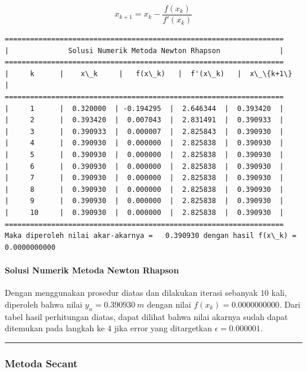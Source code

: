\documentclass[10pt, a4paper]{article}
\begin{document}
\[x_{k+1} = x_k - \frac{f(x_k)}{f'(x_k)}\]

    \begin{Verbatim}[commandchars=\\\{\}]
==================================================================
|              Solusi Numerik Metoda Newton Rhapson              |
==================================================================
|     k      |    x\_k     |   f(x\_k)   |  f'(x\_k)   |  x\_\{k+1\}   |
==================================================================
|     1      |  0.320000  | -0.194295  |  2.646344  |  0.393420  | 
|     2      |  0.393420  |  0.007043  |  2.831491  |  0.390933  | 
|     3      |  0.390933  |  0.000007  |  2.825843  |  0.390930  | 
|     4      |  0.390930  |  0.000000  |  2.825838  |  0.390930  | 
|     5      |  0.390930  |  0.000000  |  2.825838  |  0.390930  | 
|     6      |  0.390930  |  0.000000  |  2.825838  |  0.390930  | 
|     7      |  0.390930  |  0.000000  |  2.825838  |  0.390930  | 
|     8      |  0.390930  |  0.000000  |  2.825838  |  0.390930  | 
|     9      |  0.390930  |  0.000000  |  2.825838  |  0.390930  | 
|     10     |  0.390930  |  0.000000  |  2.825838  |  0.390930  | 
==================================================================
Maka diperoleh nilai akar-akarnya =   0.390930 dengan hasil f(x\_k) =    0.0000000000

    \end{Verbatim}

    \paragraph{Solusi Numerik Metoda Newton
Rhapson}\label{solusi-numerik-metoda-newton-rhapson}

Dengan menggunakan prosedur diatas dan dilakukan iterasi sebanyak \(10\)
kali, diperoleh bahwa nilai \(y_n = 0.390930\ m\) dengan nilai
\(f(x_k) = 0.0000000000\). Dari tabel hasil perhitungan diatas, dapat
dilihat bahwa nilai akarnya sudah dapat ditemukan pada langkah ke \(4\)
jika error yang ditargetkan \(\epsilon = 0.000001\).

    \begin{center}\rule{0.5\linewidth}{\linethickness}\end{center}

\newpage
\subsubsection{Metoda Secant}\label{metoda-secant}
\end{document}
